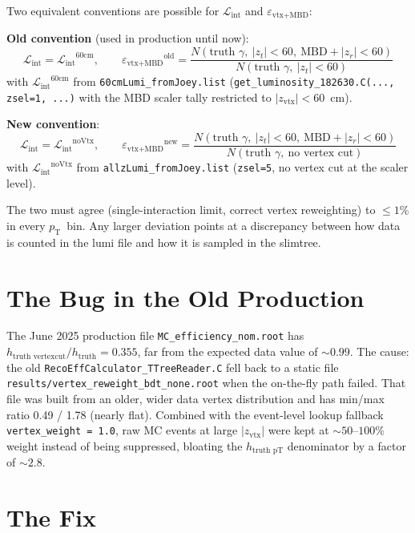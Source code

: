 \documentclass[11pt,letterpaper]{article}
\newcommand{\pT}{\ensuremath{p_{\text{T}}}}
\newcommand{\zvtx}{\ensuremath{z_{\mathrm{vtx}}}}
\newcommand{\Lint}{\ensuremath{\mathcal{L}_{\text{int}}}}
\newcommand{\veff}{\ensuremath{\varepsilon_{\text{vtx+MBD}}}}
\begin{document}
Two equivalent conventions are possible for $\Lint$ and $\veff$:

\textbf{Old convention} (used in production until now):
\begin{equation}
  \Lint = \Lint^{60\text{cm}}, \qquad
  \veff^{\text{old}} = \frac{N(\text{truth }\gamma,\ |z_t|<60,\ \text{MBD}+|z_r|<60)}{N(\text{truth }\gamma,\ |z_t|<60)}
\end{equation}
with $\Lint^{60\text{cm}}$ from \texttt{60cmLumi\_fromJoey.list}
(\texttt{get\_luminosity\_182630.C(..., zsel=1, ...)} with the MBD
scaler tally restricted to $|\zvtx|<60$~cm).

\textbf{New convention}:
\begin{equation}
  \Lint = \Lint^{\text{noVtx}}, \qquad
  \veff^{\text{new}} = \frac{N(\text{truth }\gamma,\ |z_t|<60,\ \text{MBD}+|z_r|<60)}{N(\text{truth }\gamma,\ \text{no vertex cut})}
\end{equation}
with $\Lint^{\text{noVtx}}$ from \texttt{allzLumi\_fromJoey.list}
(\texttt{zsel=5}, no vertex cut at the scaler level).

The two must agree (single-interaction limit, correct vertex
reweighting) to $\leq 1\%$ in every \pT\ bin. Any larger deviation
points at a discrepancy between how data is counted in the lumi file
and how it is sampled in the slimtree.

\section{The Bug in the Old Production}
\label{sec:bug}

The June 2025 production file \texttt{MC\_efficiency\_nom.root}
has $h_{\text{truth vertexcut}} / h_{\text{truth}} = 0.355$, far
from the expected data value of $\sim 0.99$. The cause: the old
\texttt{RecoEffCalculator\_TTreeReader.C} fell back to a static
file \texttt{results/vertex\_reweight\_bdt\_none.root} when the
on-the-fly path failed. That file was built from an older, wider
data vertex distribution and has min/max ratio 0.49 / 1.78 (nearly
flat). Combined with the event-level lookup fallback
\texttt{vertex\_weight = 1.0}, raw MC events at large $|\zvtx|$ were
kept at $\sim 50$--$100\%$ weight instead of being suppressed,
bloating the $h_{\text{truth pT}}$ denominator by a factor of
$\sim 2.8$.

\section{The Fix}
\label{sec:fix}
\end{document}
